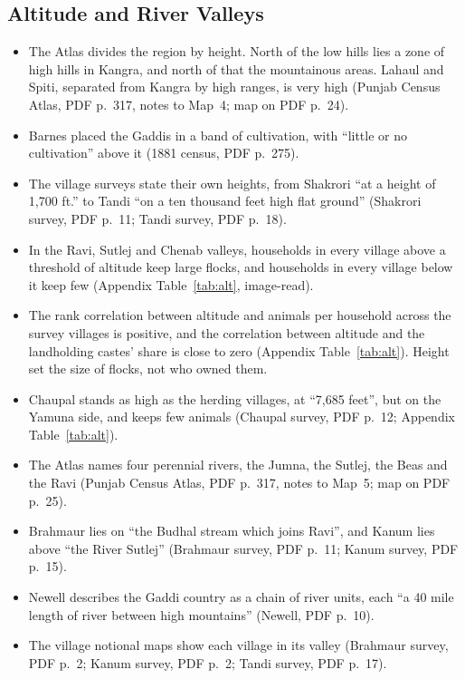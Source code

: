 \documentclass[11pt,a4paper]{article}
\newcommand{\cit}[1]{{\small(#1)}}
\begin{document}
\subsection{Altitude and River Valleys}
\begin{itemize}
\item The Atlas divides the region by height. North of the low hills lies a
  zone of high hills in Kangra, and north of that the mountainous areas.
  Lahaul and Spiti, separated from Kangra by high ranges, is very high
  \cit{Punjab Census Atlas, PDF p.~317, notes to Map~4; map on PDF p.~24}.
\item Barnes placed the Gaddis in a band of cultivation, with \enquote{little or
  no cultivation} above it \cit{1881 census, PDF p.~275}.
\item The village surveys state their own heights, from Shakrori \enquote{at a
  height of 1,700 ft.} to Tandi \enquote{on a ten thousand feet high flat
  ground} \cit{Shakrori survey, PDF p.~11; Tandi survey, PDF p.~18}.
\item In the Ravi, Sutlej and Chenab valleys, households in every village
  above a threshold of altitude keep large flocks, and households in every
  village below it keep few \cit{Appendix Table~\ref{tab:alt}, image-read}.
\item The rank correlation between altitude and animals per household across
  the survey villages is positive, and the correlation between altitude and the
  landholding castes' share is close to zero \cit{Appendix
  Table~\ref{tab:alt}}. Height set the size of flocks, not who owned them.
\item Chaupal stands as high as the herding villages, at \enquote{7,685 feet},
  but on the Yamuna side, and keeps few animals \cit{Chaupal survey, PDF
  p.~12; Appendix Table~\ref{tab:alt}}.
\item The Atlas names four perennial rivers, the Jumna, the Sutlej, the Beas
  and the Ravi \cit{Punjab Census Atlas, PDF p.~317, notes to Map~5; map on
  PDF p.~25}.
\item Brahmaur lies on \enquote{the Budhal stream which joins Ravi}, and Kanum
  lies above \enquote{the River Sutlej} \cit{Brahmaur survey, PDF p.~11; Kanum
  survey, PDF p.~15}.
\item Newell describes the Gaddi country as a chain of river units, each
  \enquote{a 40 mile length of river between high mountains} \cit{Newell,
  PDF p.~10}.
\item The village notional maps show each village in its valley
  \cit{Brahmaur survey, PDF p.~2; Kanum survey, PDF p.~2; Tandi survey,
  PDF p.~17}.
\end{itemize}
\end{document}
